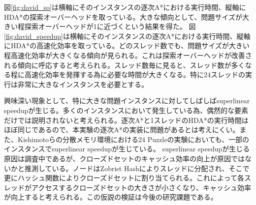 \documentclass[uplatex]{jsarticle}
\begin{document}

図\ref{fig:david_so}は横軸にそのインスタンスの逐次A*における実行時間、縦軸にHDA*の探索オーバーヘッドを取っている。大きな傾向として、問題サイズが大きい程探索オーバーヘッドが1に近づくという結果を得た。
図\ref{fig:david_speedup}は横軸にそのインスタンスの逐次A*における実行時間、縦軸にHDA*の高速化効率を取っている。どのスレッド数でも、問題サイズが大きい程高速化効率が大きくなる傾向が見られる。これは探索オーバーヘッドが改善される傾向に呼応すると考えられる。スレッド数毎に見ると、スレッド数が多くなる程に高速化効率を発揮する為に必要な時間が大きくなる。特に24スレッドの実行は非常に大きなインスタンスを必要とする。

興味深い現象として、特に大きな問題インスタンスに対してしばしばsuperlinear speedupが生じる。多くのインスタンスにおいて発生している為、偶然的な要素だけでは説明されないと考えられる。逐次A*と1スレッドのHDA*の実行時間はほぼ同じであるので、本実験の逐次A*の実装に問題があるとは考えにくい。また、Kishimotoらの分散メモリ環境における24 Puzzleの実験においても、一部のインスタンスでsuperlinear speedupが生じている\cite{Kishimoto2013}。
superlinear speedupが生じる原因は調査中であるが、クローズドセットのキャッシュ効率の向上が原因ではないかと推測している。ノードはZobrist Hashによりスレッドに分配され、そこで更にハッシュ関数によりクローズドセットに割り当てられる。これによって各スレッドがアクセスするクローズドセットの大きさが小さくなり、キャッシュ効率が向上すると考えられる。この仮説の検証は今後の研究課題である。


\end{document}

